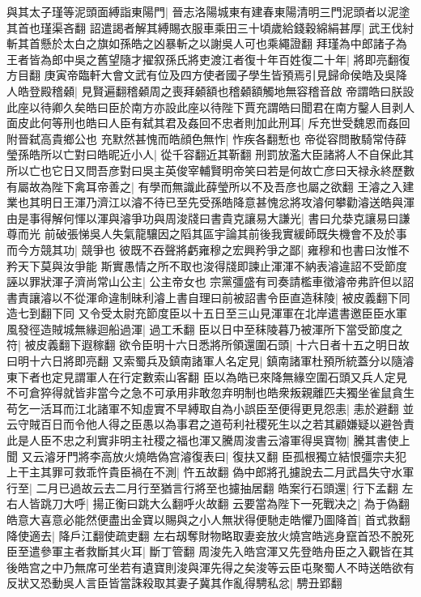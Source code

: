 與其太子瑾等泥頭面縛詣東陽門|{
	晉志洛陽城東有建春東陽清明三門泥頭者以泥塗其首也瑾渠吝翻}
詔遣謁者解其縛賜衣服車乘田三十頃歲給錢穀綿絹甚厚|{
	武王伐紂斬其首懸於太白之旗如孫皓之凶暴斬之以謝吳人可也乘繩證翻}
拜瑾為中郎諸子為王者皆為郎中吳之舊望隨才擢叙孫氏將吏渡江者復十年百姓復二十年|{
	將即亮翻復方目翻}
庚寅帝臨軒大會文武有位及四方使者國子學生皆預焉引見歸命侯皓及吳降人皓登殿稽顙|{
	見賢遍翻稽顙周之喪拜顙額也稽顙額觸地無容稽音啟}
帝謂皓曰朕設此座以待卿久矣皓曰臣於南方亦設此座以待陛下賈充謂皓曰聞君在南方鑿人目剥人面皮此何等刑也皓曰人臣有弑其君及姦回不忠者則加此刑耳|{
	斥充世受魏恩而姦回附晉弑高貴鄉公也}
充默然甚愧而皓顔色無怍|{
	怍疾各翻慙也}
帝從容問散騎常侍薛瑩孫皓所以亡對曰皓昵近小人|{
	從千容翻近其靳翻}
刑罰放濫大臣諸將人不自保此其所以亡也它日又問吾彦對曰吳主英俊宰輔賢明帝笑曰若是何故亡彦曰天禄永終歷數有屬故為陛下禽耳帝善之|{
	有學而無識此薛瑩所以不及吾彦也屬之欲翻}
王濬之入建業也其明日王渾乃濟江以濬不待已至先受孫皓降意甚愧忿將攻濬何攀勸濬送皓與渾由是事得解何惲以渾與濬爭功與周浚牋曰書貴克讓易大謙光|{
	書曰允㳟克讓易曰謙尊而光}
前破張悌吳人失氣龍驤因之䧟其區宇論其前後我實緩師既失機會不及於事而今方競其功|{
	競爭也}
彼既不吞聲將虧雍穆之宏興矜爭之鄙|{
	雍穆和也書曰汝惟不矜天下莫與汝爭能}
斯實愚情之所不取也浚得牋即諫止渾渾不納表濬違詔不受節度誣以罪狀渾子濟尚常山公主|{
	公主帝女也}
宗黨彊盛有司奏請檻車徵濬帝弗許但以詔書責讓濬以不從渾命違制昧利濬上書自理曰前被詔書令臣直造秣陵|{
	被皮義翻下同造七到翻下同}
又令受太尉充節度臣以十五日至三山見渾軍在北岸遣書邀臣臣水軍風發徑造賊城無緣迴船過渾|{
	過工禾翻}
臣以日中至秣陵暮乃被渾所下當受節度之符|{
	被皮義翻下遐稼翻}
欲令臣明十六日悉將所領還圍石頭|{
	十六日者十五之明日故曰明十六日將即亮翻}
又索蜀兵及鎮南諸軍人名定見|{
	鎮南諸軍杜預所統蓋分以隨濬東下者也定見謂軍人在行定數索山客翻}
臣以為皓已來降無緣空圍石頭又兵人定見不可倉猝得就皆非當今之急不可承用非敢忽弃明制也皓衆叛親離匹夫獨坐雀鼠貪生苟乞一活耳而江北諸軍不知虛實不早縛取自為小誤臣至便得更見怨恚|{
	恚於避翻}
並云守賊百日而令他人得之臣愚以為事君之道苟利社稷死生以之若其顧嫌疑以避咎責此是人臣不忠之利實非明主社稷之福也渾又騰周浚書云濬軍得吳寶物|{
	騰其書使上聞}
又云濬牙門將李高放火燒皓偽宫濬復表曰|{
	復扶又翻}
臣孤根獨立結恨彊宗夫犯上干主其罪可救乖忤貴臣禍在不測|{
	忤五故翻}
偽中郎將孔攄說去二月武昌失守水軍行至|{
	二月已過故云去二月行至猶言行將至也攄抽居翻}
皓案行石頭還|{
	行下孟翻}
左右人皆跳刀大呼|{
	揚正衡曰跳大么翻呼火故翻}
云要當為陛下一死戰决之|{
	為于偽翻}
皓意大喜意必能然便盡出金寶以賜與之小人無狀得便馳走皓懼乃圖降首|{
	首式救翻}
降使適去|{
	降戶江翻使疏吏翻}
左右刼奪財物略取妻妾放火燒宫皓逃身竄首恐不脫死臣至遣參軍主者救斷其火耳|{
	斷丁管翻}
周浚先入皓宫渾又先登皓舟臣之入觀皆在其後皓宫之中乃無席可坐若有遺寶則浚與渾先得之矣浚等云臣屯聚蜀人不時送皓欲有反狀又恐動吳人言臣皆當誅殺取其妻子冀其作亂得騁私忿|{
	騁丑郢翻}
